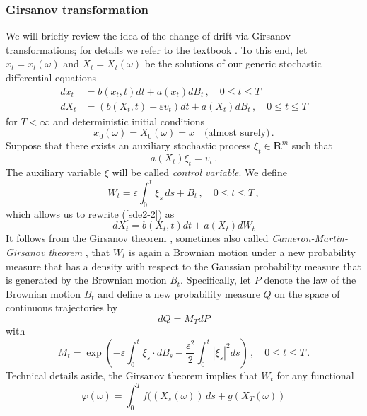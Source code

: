 \documentclass[]{tMPH2e}
\newcommand{\R}{{\mathbf R}}
\newcommand{\eps}{\varepsilon}
\newcommand{\wrt}{with respect to }
\begin{document}
\subsubsection*{Girsanov transformation}
We will briefly review the idea of the change of drift via Girsanov transformations; for details we refer to the textbook \cite{oksendal2003stochastic}. To this end, let $x_{t}=x_{t}(\omega)$ and $X_{t}=X_{t}(\omega)$ be the solutions of our generic stochastic differential equations
\begin{subequations}\label{sde2}
\begin{align}
dx_{t} & = b(x_{t},t)dt + a(x_{t})dB_{t}\,,\quad 0\le t\le T  \label{sde2-1}\\
dX_{t} & = (b(X_{t},t) + \eps v_{t})dt +a(X_{t})dB_{t}\,,\quad 0\le t\le T \label{sde2-2}
\end{align}
\end{subequations}
for $T<\infty$ and deterministic initial conditions
\[
x_{0}(\omega) = X_{0}(\omega) = x\quad\textrm{(almost surely)}\,.
\]
Suppose that there exists an auxiliary stochastic process $\xi_{t}\in\R^{m}$ such that 
\begin{equation}\label{xi}
a(X_{t})\xi_{t} = v_{t}\,.
\end{equation}
The auxiliary variable $\xi$ will be called \emph{control variable}. We define  
\[
W_{t} = \eps\int_{0}^{t}\xi_{s}\,ds + B_{t}\,,\quad 0\le t\le T\,,
\]
which allows us to rewrite (\ref{sde2-2}) as
\begin{equation}\label{sde2-3}
dX_{t} = b(X_{t},t)dt +a(X_{t})dW_{t} 
\end{equation}
It follows from the Girsanov theorem \cite[Thm.~8.6.8]{oksendal2003stochastic}, sometimes also called \emph{Cameron-Martin-Girsanov theorem} \cite{stroock2006}, that $W_{t}$ is again a Brownian motion under a new probability measure that has a density \wrt the Gaussian probability measure that is generated by the Brownian motion $B_{t}$. Specifically, let $P$ denote the law of the Brownian motion $B_{t}$ and define a new probability measure $Q$ on the space of continuous trajectories by 
\[
dQ=M_{T}dP
\]
with 
\begin{equation}\label{likelihood}
M_{t} = \exp\left(-\eps\int_{0}^{t}\xi_{s}\cdot dB_{s} - \frac{\eps^{2}}{2}\int_{0}^{t}|\xi_{s}|^{2}ds\right)\,,\quad 0\le t\le T\,.
\end{equation}
Technical details aside, the Girsanov theorem implies that $W_{t}$  for any functional 
\[
\varphi(\omega)=\int_{0}^{T}f((X_{s}(\omega))\,ds + g(X_{T}(\omega))
\] 
\end{document}
